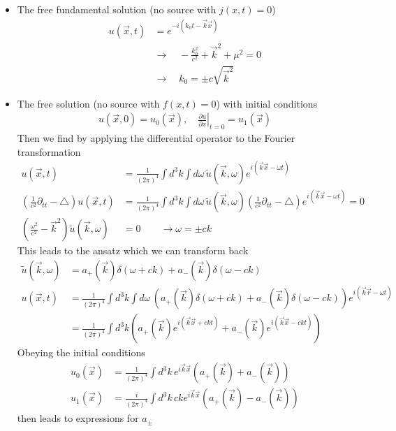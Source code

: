 \documentclass[10pt,a4paper]{book}
\theoremstyle{definition}
\begin{document}
\begin{itemize}
\item The free fundamental solution (no source with $j(x,t)=0$)
\begin{align}
u(\vec{x},t)&=e^{-i(k_0t-\vec{k}\vec{x})}\\
&\rightarrow\quad -\frac{k_0^2}{c^2}+\vec{k}^2+\mu^2=0\\
&\rightarrow\quad k_0=\pm c\sqrt{\vec{k}^2}
\end{align}

\item The free solution (no source with $f(x,t)=0$) with initial conditions
\begin{align}
u(\vec{x},0)=u_0(\vec{x}),\quad \left.\frac{\partial u}{\partial x}\right|_{t=0}=u_1(\vec{x})
\end{align}
Then we find by applying the differential operator to the Fourier transformation
\begin{align}
u(\vec{x},t)&=\frac{1}{(2\pi)^4}\int d^3k\int d\omega\, \tilde{u}(\vec{k},\omega)e^{i(\vec{k}\vec{x}-\omega t)}\\
\left(\frac{1}{c^2}\partial_{tt}-\triangle\right) u(\vec{x},t)&=\frac{1}{(2\pi)^4}\int d^3k\int d\omega\, \tilde{u}(\vec{k},\omega)\left(\frac{1}{c^2}\partial_{tt}-\triangle\right)e^{i(\vec{k}\vec{x}-\omega t)}=0\\
\left(\frac{\omega^2}{c^2}-\vec{k}^2\right)\tilde{u}(\vec{k},\omega)&=0\qquad\rightarrow\omega=\pm ck
\end{align}
This leads to the ansatz which we can transform back
\begin{align}
\tilde{u}(\vec{k},\omega)&=a_+(\vec{k})\delta(\omega+ck)+a_-(\vec{k})\delta(\omega-ck)\\
u(\vec{x},t)
&=\frac{1}{(2\pi)^4}\int d^3k\int d\omega\, \left(a_+(\vec{k})\delta(\omega+ck)+a_-(\vec{k})\delta(\omega-ck)\right)e^{i(\vec{k}\vec{r}-\omega t)}\\
&=\frac{1}{(2\pi)^4}\int d^3k \left(a_+(\vec{k})e^{i(\vec{k}\vec{x}+ckt)}+a_-(\vec{k})e^{i(\vec{k}\vec{x}-ckt)}\right)
\end{align}
Obeying the initial conditions
\begin{align}
u_0(\vec{x})&=\frac{1}{(2\pi)^4}\int d^3k\, e^{i\vec{k}\vec{x}}\left(a_+(\vec{k})+a_-(\vec{k})\right)\\
u_1(\vec{x})&=\frac{i}{(2\pi)^4}\int d^3k\, cke^{i\vec{k}\vec{x}}\left(a_+(\vec{k})-a_-(\vec{k})\right)
\end{align}
then leads to expressions for $a_\pm$
\begin{align}

\end{align}
\end{itemize}
\end{document}
